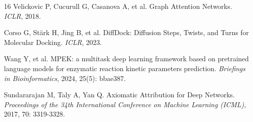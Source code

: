 \documentclass[11pt]{article}
\begin{document}
\begin{thebibliography}{16}
Velickovic P, Cucurull G, Casanova A, et al. Graph Attention Networks. \textit{ICLR}, 2018.

Corso G, Stärk H, Jing B, et al. DiffDock: Diffusion Steps, Twists, and Turns for Molecular Docking. \textit{ICLR}, 2023.

Wang Y, et al. MPEK: a multitask deep learning framework based on pretrained language models for enzymatic reaction kinetic parameters prediction. \textit{Briefings in Bioinformatics}, 2024, 25(5): bbae387.

Sundararajan M, Taly A, Yan Q. Axiomatic Attribution for Deep Networks. \textit{Proceedings of the 34th International Conference on Machine Learning (ICML)}, 2017, 70: 3319-3328.

\end{thebibliography}
\end{document}
